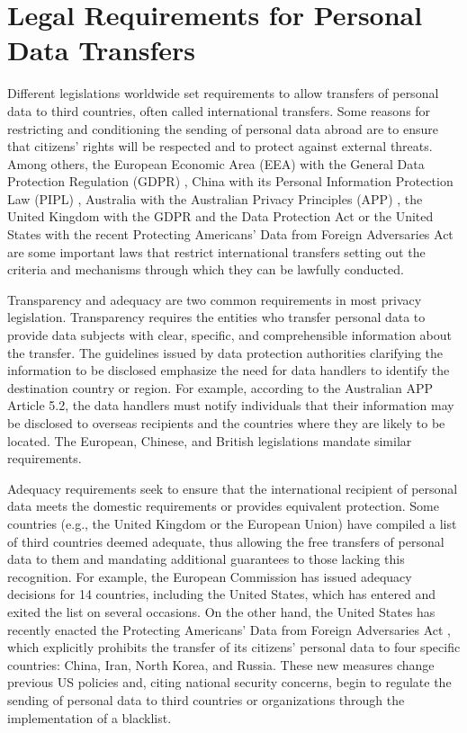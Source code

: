 \documentclass{article}
\begin{document}
\section{Legal Requirements for Personal Data Transfers}

Different legislations worldwide set requirements to allow transfers of personal data to third countries, often called international transfers. Some reasons for restricting and conditioning the sending of personal data abroad are to ensure that citizens' rights will be respected and to protect against external threats. Among others, the European Economic Area (EEA) with the General Data Protection Regulation (GDPR) \cite{REGULATIONSRelevance}, China with its Personal Information Protection Law (PIPL) \cite{TheTranslation}, Australia with the Australian Privacy Principles (APP) \cite{ReadOAIC}, the United Kingdom with the GDPR and the Data Protection Act \cite{Data2018} or the United States with the recent Protecting Americans' Data from Foreign Adversaries Act \cite{Rep.Pallone2024Text2024} are some important laws that restrict international transfers setting out the criteria and mechanisms through which they can be lawfully conducted.

Transparency and adequacy are two common requirements in most privacy legislation. Transparency requires the entities who transfer personal data to provide data subjects with clear, specific, and comprehensible information about the transfer. The guidelines issued by data protection authorities clarifying the information to be disclosed emphasize the need for data handlers to identify the destination country or region. For example, according to the Australian APP Article 5.2, the data handlers must notify individuals that their information may be disclosed to overseas recipients and the countries where they are likely to be located. The European, Chinese, and British legislations mandate similar requirements.

Adequacy requirements seek to ensure that the international recipient of personal data meets the domestic requirements or provides equivalent protection. Some countries (e.g., the United Kingdom or the European Union) have compiled a list of third countries deemed adequate, thus allowing the free transfers of personal data to them and mandating additional guarantees to those lacking this recognition. For example, the European Commission has issued adequacy decisions for 14 countries, including the United States, which has entered and exited the list on several occasions. On the other hand, the United States has recently enacted the Protecting Americans' Data from Foreign Adversaries Act \cite{Rep.Pallone2024Text2024}, which explicitly prohibits the transfer of its citizens' personal data to four specific countries: China, Iran, North Korea, and Russia. These new measures change previous US policies and, citing national security concerns, begin to regulate the sending of personal data to third countries or organizations through the implementation of a blacklist.
\end{document}
